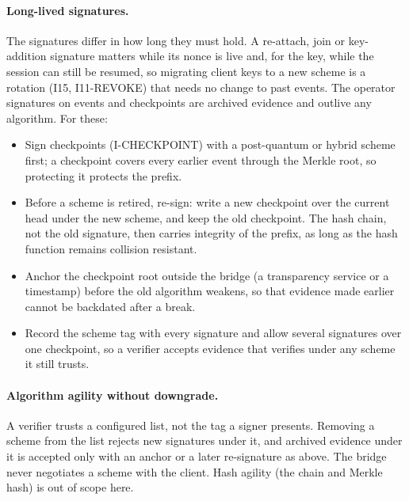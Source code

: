\paragraph{Long-lived signatures.} The signatures differ in how long they
must hold. A re-attach, join or key-addition signature matters while its
nonce is live and, for the key, while the session can still be resumed,
so migrating client keys to a new scheme is a rotation (I15,
I11-REVOKE) that needs no change to past events. The operator
signatures on events and checkpoints are archived evidence and outlive any
algorithm. For these:
\begin{itemize}
\item Sign checkpoints (I-CHECKPOINT) with a post-quantum or hybrid scheme
 first; a checkpoint covers every earlier event through the Merkle root,
 so protecting it protects the prefix.
\item Before a scheme is retired, re-sign: write a new checkpoint over the
 current head under the new scheme, and keep the old checkpoint. The
 hash chain, not the old signature, then carries integrity of the prefix, as
 long as the hash function remains collision resistant.
\item Anchor the checkpoint root outside the bridge (a transparency
 service or a timestamp) before the old algorithm weakens, so that
 evidence made earlier cannot be backdated after a break.
\item Record the scheme tag with every signature and allow several
 signatures over one checkpoint, so a verifier accepts evidence that
 verifies under any scheme it still trusts.
\end{itemize}

\paragraph{Algorithm agility without downgrade.} A verifier trusts a
configured list, not the tag a signer presents. Removing a scheme from the
list rejects new signatures under it, and archived evidence under it is
accepted only with an anchor or a later re-signature as above. The bridge
never negotiates a scheme with the client. Hash agility (the chain and
Merkle hash) is out of scope here.
